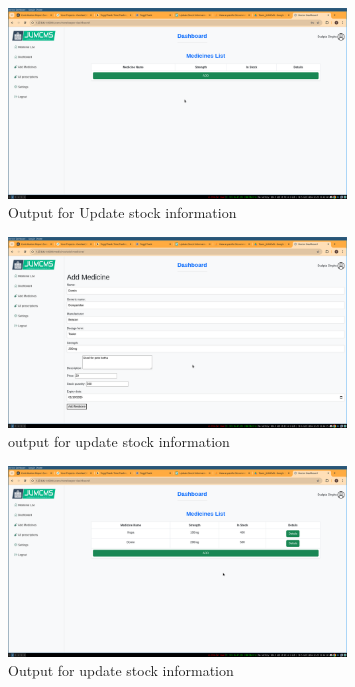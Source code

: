 \documentclass[a4paper,12pt]{article}
\begin{document}
\begin{figure}[H]
    \centering
    \includegraphics[width=0.8\textwidth]{images/spr2output1.png}
    \caption{Output for Update stock information}
    \label{fig:sp2out1}
\end{figure}


\begin{figure}[H]
    \centering
    \includegraphics[width=0.8\textwidth]{images/spr2output2.png}
    \caption{output for update stock information}
    \label{fig:sp2out2}
\end{figure}


\begin{figure}[H]
    \centering
    \includegraphics[width=0.8\textwidth]{images/spr2output3.png}
    \caption{Output for update stock information}
    \label{fig:sp2out3}
\end{figure}
\end{document}
